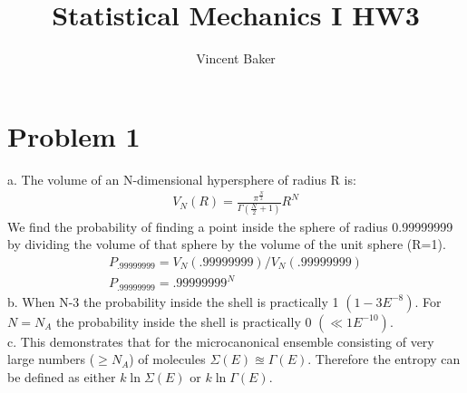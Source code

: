 \documentclass[a4paper,11pt]{article}
\title{Statistical Mechanics I HW3}
\author{Vincent Baker}
\numberwithin{equation}{section}
\begin{document}
\maketitle

\section{Problem 1}
a. The volume of an N-dimensional hypersphere of radius R is:
\begin{gather}
 V_N(R)=\frac{\pi^{\frac{N}{2}}}{\Gamma(\frac{N}{2}+1)}R^N
\end{gather}
We find the probability of finding a point inside the sphere of radius 0.99999999 by dividing the volume of that sphere by the volume of the unit sphere (R=1).
\begin{gather}
 P_{.99999999}= V_N(.99999999)/V_N(.99999999)\\
 P_{.99999999}= .99999999^N
\end{gather}
b. When N-3 the probability inside the shell is practically 1 $(1-3E^{-8})$.
For $N=N_A$ the probability inside the shell is practically 0 $(\ll 1E^{-10})$.
\\
c. This demonstrates that for the microcanonical ensemble consisting of very large numbers ($\ge N_A$) of molecules $\Sigma (E) \approxeq \Gamma (E)$.
Therefore the entropy can be defined as either $k \ln{\Sigma (E)}$ or $k \ln{\Gamma (E)}$.
\end{document}
